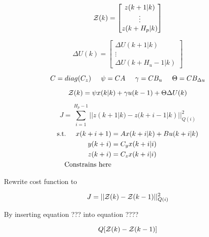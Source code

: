 \begin{equation}
	\CMcal{Z}(k)= 
	\begin{bmatrix}
	z(k+1|k)\\
	\vdots\\
	z(k+H_p|k)
	\end{bmatrix}
\end{equation}

\begin{equation}
	\Delta U(k)= 
	\begin{bmatrix}
	\Delta U(k+1|k)\\
	\vdots\\
	\Delta U(k+H_u -1|k)
	\end{bmatrix}
\end{equation}


\begin{equation}
	C = diag(C_z) \hspace{5mm} \psi = CA  \hspace{5mm} \gamma = CB_u \hspace{5mm}  \Theta = CB_{\Delta u}
\end{equation}

\begin{equation}
	\CMcal{Z}(k) = \psi x(k|k) + \gamma u(k-1) + \Theta \Delta U(k)
\end{equation}


\begin{equation}
	 J = \sum_{i=1}^{H_p-1} || z(k+1|k)-z(k+i-1|k)||_{Q(i)}^2
\end{equation}
\begin{equation}
	\begin{aligned}
	\text{s.t.} \hspace{5mm}  x(k+i+1) &= Ax(k+i|k)+Bu(k+i|k) \\
						      y(k+i)&= C_yx(k+i|i) \\
						      z(k+i)&= C_zx(k+i|i)\\
						      \text{Constrains here}
	\end{aligned}
\end{equation}


Rewrite cost function to

\begin{equation}
	J = ||\CMcal{Z}(k)-\CMcal{Z}(k-1)||_{Q(i)}^2
\end{equation}

By inserting equation ??? into equation ????

\begin{equation}
	[\CMcal{Z}(k)^T - \CMcal{Z}(k-1)^T]Q[\CMcal{Z}(k) - \CMcal{Z}(k-1)]
\end{equation}



